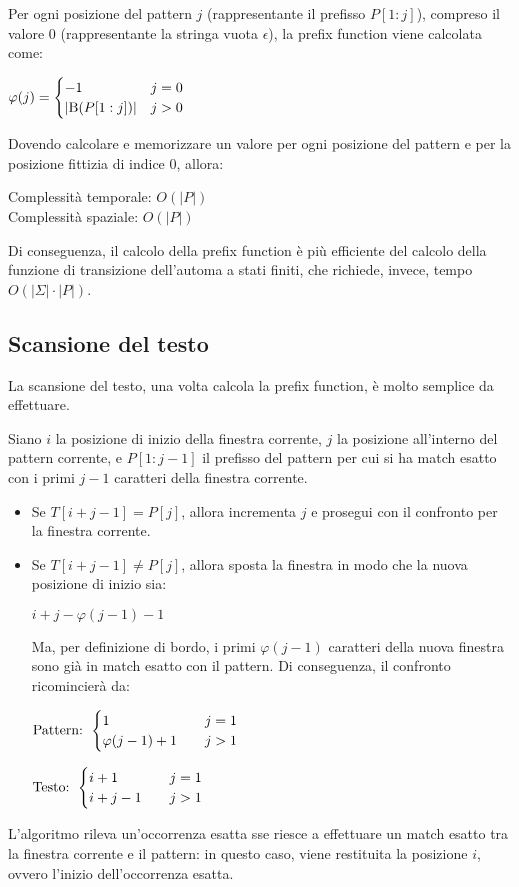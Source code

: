 Per ogni posizione del pattern $j$ (rappresentante il prefisso $P[1:j]$), compreso il valore 0 (rappresentante la stringa vuota $\epsilon$), la prefix function viene calcolata come:
\begin{center}
    $\varphi(j) = \begin{cases}
        -1 & j = 0 \\
        |\textnormal{B}(P[1:j])| & j > 0
    \end{cases}$
\end{center}
Dovendo calcolare e memorizzare un valore per ogni posizione del pattern e per la posizione fittizia di indice 0, allora:
\begin{center}
    Complessità temporale: $O(|P|)$\\
    Complessità spaziale: $O(|P|)$
\end{center}
Di conseguenza, il calcolo della prefix function è più efficiente del calcolo della funzione di transizione dell'automa a stati finiti, che richiede, invece, tempo $O(|\Sigma| \cdot |P|)$.
\subsection*{Scansione del testo}
La scansione del testo, una volta calcola la prefix function, è molto semplice da effettuare.

Siano $i$ la posizione di inizio della finestra corrente, $j$ la posizione all'interno del pattern corrente, e $P[1:j-1]$ il prefisso del pattern per cui si ha match esatto con i primi $j-1$ caratteri della finestra corrente.
\begin{itemize}
    \item Se $T[i + j - 1] = P[j]$, allora incrementa $j$ e prosegui con il    confronto per la finestra corrente.\\
    \item Se $T[i + j - 1] \neq P[j]$, allora sposta la finestra in modo che la nuova posizione di inizio sia:
    \begin{center}
        $i + j - \varphi(j-1) - 1$
    \end{center}
    Ma, per definizione di bordo, i primi $\varphi(j - 1)$ caratteri della nuova finestra sono già in match esatto con il pattern.
    Di conseguenza, il confronto ricomincierà da:
    \begin{center}
        $\textnormal{Pattern: } \begin{cases}
            1 & \quad j = 1 \\
            \varphi(j-1) + 1 & \quad j > 1
        \end{cases}$
    \end{center}
    \begin{center}
        $\textnormal{Testo: } \begin{cases}
            i + 1 & \quad j = 1 \\
            i + j - 1 & \quad j > 1
        \end{cases}$
    \end{center}
\end{itemize}
L'algoritmo rileva un'occorrenza esatta sse riesce a effettuare un match esatto tra la finestra corrente e il pattern: in questo caso, viene restituita la posizione $i$, ovvero l'inizio dell'occorrenza esatta.

